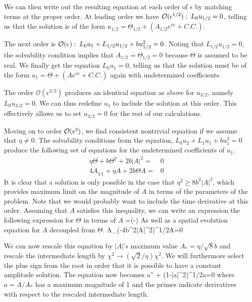 \documentclass[../main/WavelengthCompetition.tex]{subfiles}
\begin{document}
We can then write out the resulting equation at each order of $\epsilon$ by matching terms at the proper order.
At leading order we have $\mathcal{O}(\epsilon^{1/2}): \: L_0 u_{1/2} =0$, telling us that the solution is of the form $u_{1/2} =\Theta_{1/2} + (A_{1/2} e^{ix} +C.C.)$.

The next order is $\mathcal{O}(\epsilon^{}): \:  L_0 u_{1}+L_{1/2} u_{1/2}  +b u_{1/2}^2=0$.  Noting that $L_{1/2} u_{1/2} =0$, the solvability condition implies that $A_{1/2}=\Theta_{1/2}=0$ because $\Theta$ is assumed to be real.  We finally get the equation $L_0 u_1=0$, telling us that the solution must be of the form $u_{1} =\Theta + (A e^{ix} +C.C.)$ again with undetermined coefficients.

The order $\mathcal{O}(\epsilon^{3/2})$ produces an  identical equation as above for $u_{3/2}$, namely $L_0 u_{3/2} =0$.  We can thus redefine $u_1$ to include the solution at this order.  This effectively allows us to set $u_{3/2}=0$ for the rest of our calculations.

Moving on to order $\mathcal{O}(\epsilon^{2})$, we find consistent nontrivial equation if we assume that $\eta\neq0$.  The solvability conditions from the equation, $L_0 u_2 +L_1 u_1 +b u_1^2=0$ produce the following set of equations for the undetermined coefficients of $u_1$.
\begin{subequations}
\begin{align}
\eta \Theta+b\Theta^2+2b| A|^2 =&0\\
4 A_{\chi\chi}+\eta A +2 b \Theta A =&0
\end{align}
\end{subequations}
It is clear that a solution is only possible in the case that $\eta^2\geq 8 b^2 |A|^2$, which provides maximum limit on the magnitude of $A$ in terms of the parameters of the problem.  Note that we would probably want to include the time derivative at this order.  Assuming that $A$ satisfies this inequality, we can write an expression the following expression for $\Theta$ in terms of $A$
\beqn
\Theta=\left(-\eta\pm{}\right)
\eeqn
As well as a spatial evolution equation for $A$ decoupled from $\Theta$.
\beqn
A_{\chi\chi}\pm \left(-4b^2|A|^2\right)^{1/2}A=0
\eeqn

We can now rescale this equation by $|A|$'s maximum value $A_*=\eta/\sqrt{8}b$ and rescale the intermediate length by $\chi^2 \rightarrow(\sqrt{2}/\eta) \chi^2$.  We will furthermore select the plus sign from the root in order that it is possible to have a constant amplitude solution.  The equation now becomes
\beqn
a'' + \left(1-|a|^2\right)^{1/2}a=0
\eeqn
where $a=A/A_*$ has a maximum magnitude of 1 and the primes indicate derivatives with respect to the rescaled intermediate length.
\end{document}
